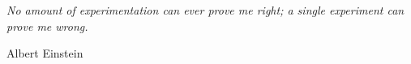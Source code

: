 
\thispagestyle{empty}


\begin{center}
\begin{minipage}{12.4cm}
\begin{large}
\emph{No amount of experimentation can ever prove me right; a single experiment can prove me wrong.}
\begin{flushright}
Albert Einstein\\%
\end{flushright}
\end{large}
\end{minipage}
\end{center}



\newpage
\thispagestyle{empty}
